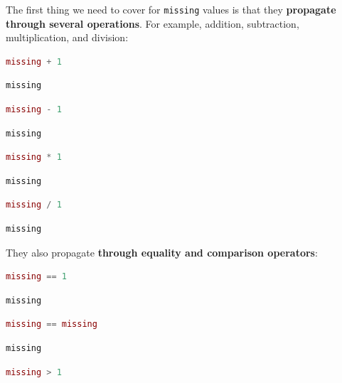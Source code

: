 \documentclass[
  notoc %
]{tufte-book}
\newcommand{\passthrough}[1]{#1}
\begin{document}
The first thing we need to cover for \passthrough{\lstinline!missing!}
values is that they \textbf{propagate through several operations}. For
example, addition, subtraction, multiplication, and division:

\begin{lstlisting}[language=Julia]
missing + 1
\end{lstlisting}

\begin{lstlisting}[language=Output]
missing
\end{lstlisting}

\begin{lstlisting}[language=Julia]
missing - 1
\end{lstlisting}

\begin{lstlisting}[language=Output]
missing
\end{lstlisting}

\begin{lstlisting}[language=Julia]
missing * 1
\end{lstlisting}

\begin{lstlisting}[language=Output]
missing
\end{lstlisting}

\begin{lstlisting}[language=Julia]
missing / 1
\end{lstlisting}

\begin{lstlisting}[language=Output]
missing
\end{lstlisting}

They also propagate \textbf{through equality and comparison operators}:

\begin{lstlisting}[language=Julia]
missing == 1
\end{lstlisting}

\begin{lstlisting}[language=Output]
missing
\end{lstlisting}

\begin{lstlisting}[language=Julia]
missing == missing
\end{lstlisting}

\begin{lstlisting}[language=Output]
missing
\end{lstlisting}

\begin{lstlisting}[language=Julia]
missing > 1
\end{lstlisting}
\end{document}
